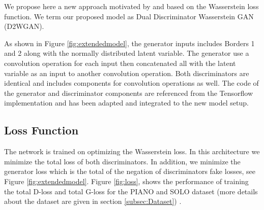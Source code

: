 \documentclass{article} %
\begin{document}
We propose here a new approach motivated by \cite{nguyen2017dual} and based on the Wasserstein loss function. We term our proposed model as Dual Discriminator Wasserstein GAN (D2WGAN).

As shown in Figure \ref{fig:extendedmodel}, the generator inputs includes Borders 1 and 2 along with the normally distributed latent variable. The generator use a convolution operation for each input then concatenated all with the latent variable as an input to another convolution operation. Both discriminators are identical and includes components for convolution operations as well. The code of the generator and discriminator components are referenced from the Tensorflow implementation \cite{codegan} and has been adapted and integrated to the new model setup.

\subsection{Loss Function}
The network is trained on optimizing the Wasserstein loss. In this architecture we minimize the total loss of both discriminators. In addition, we minimize the generator loss which is the total of the negation of discriminators fake losses, see Figure \ref{fig:extendedmodel}. Figure \ref{fig:loss}, shows the performance of training the total D-loss and total G-loss for the PIANO and SOLO dataset (more details about the dataset are given in section \ref{subsec:Dataset}) . 
\end{document}
